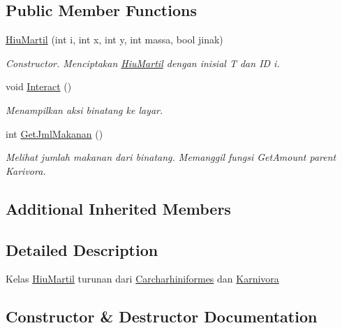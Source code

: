 \subsection*{Public Member Functions}
\begin{DoxyCompactItemize}
\item 
\hyperlink{classHiuMartil_a376ac60795c3c37cec40714635d47b8a}{Hiu\+Martil} (int i, int x, int y, int massa, bool jinak)
\begin{DoxyCompactList}\small\item\em Constructor. Menciptakan \hyperlink{classHiuMartil}{Hiu\+Martil} dengan inisial \textquotesingle{}T\textquotesingle{} dan ID i. \end{DoxyCompactList}\item 
void \hyperlink{classHiuMartil_a9329d5115ecdfd2eb91137b481dfe863}{Interact} ()\hypertarget{classHiuMartil_a9329d5115ecdfd2eb91137b481dfe863}{}\label{classHiuMartil_a9329d5115ecdfd2eb91137b481dfe863}

\begin{DoxyCompactList}\small\item\em Menampilkan aksi binatang ke layar. \end{DoxyCompactList}\item 
int \hyperlink{classHiuMartil_a8b643c318a9b69730c26a73b268f0b2c}{Get\+Jml\+Makanan} ()
\begin{DoxyCompactList}\small\item\em Melihat jumlah makanan dari binatang. Memanggil fungsi Get\+Amount parent Karivora. \end{DoxyCompactList}\end{DoxyCompactItemize}
\subsection*{Additional Inherited Members}


\subsection{Detailed Description}
Kelas \hyperlink{classHiuMartil}{Hiu\+Martil} turunan dari \hyperlink{classCarcharhiniformes}{Carcharhiniformes} dan \hyperlink{classKarnivora}{Karnivora} 

\subsection{Constructor \& Destructor Documentation}
